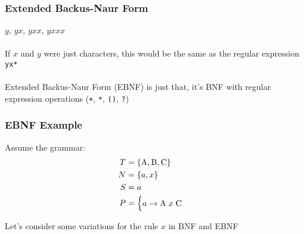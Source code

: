 \documentclass[aspectratio=169]{beamer}
\begin{document}
\begin{frame}
\frametitle{Extended Backus-Naur Form}

$y$, $yx$, $yxx$, $yxxx$\\~\\

If $x$ and $y$ were just characters, this would be the same as the regular
expression \lstinline{yx*}\\~\\

\alert{Extended Backus-Naur Form} (EBNF) is just that, it's BNF with regular
expression operations (\lstinline{+}, \lstinline{*}, \lstinline{()},
\lstinline{?})
\end{frame}

\begin{frame}
\frametitle{EBNF Example}

Assume the grammar:
\begin{align*}
T &= \{ \text{\lstinline{A}}, \text{\lstinline{B}}, \text{\lstinline{C}} \}\\
N &= \{ a, x \}\\
S &= a\\
P &= \begin{cases}a \rightarrow \text{\lstinline{A}} \; x \;
     \text{\lstinline{C}}\end{cases}
\end{align*}

Let's consider some variations for the rule $x$ in BNF and EBNF
\end{frame}
\end{document}

